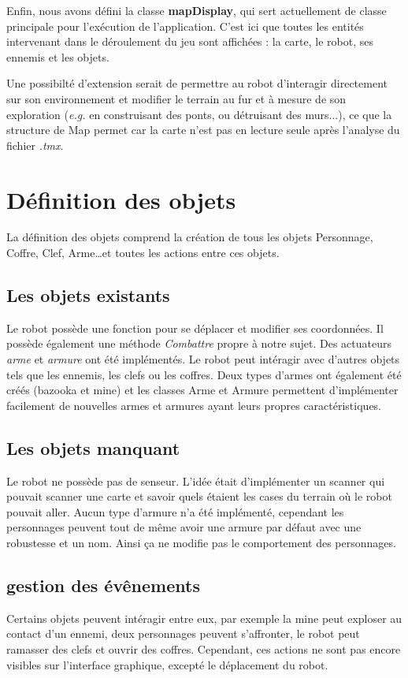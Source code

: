 \documentclass[a4paper 12pts]{article}
\begin{document}
Enfin, nous avons défini la classe \textbf{mapDisplay}, qui sert actuellement de classe principale pour l'exécution de l'application. C'est ici que toutes les entités intervenant dans le déroulement du jeu sont affichées : la carte, le robot, ses ennemis et les objets.

Une possibilté d'extension serait de permettre au robot d'interagir directement sur son environnement et modifier le terrain au fur et à mesure de son exploration (\emph{e.g.} en construisant des ponts, ou détruisant des murs...), ce que la structure de Map permet car la carte n'est pas en lecture seule après l'analyse du fichier \emph{.tmx}. 



\section{Définition des objets}
La définition des objets comprend la création de tous les objets Personnage, Coffre, Clef, Arme\ldots et toutes les actions entre ces objets.

\subsection{Les objets existants}
Le robot possède une fonction pour se déplacer et modifier ses coordonnées. Il possède également une méthode \emph{Combattre} propre à notre sujet. Des actuateurs \emph{arme} et \emph{armure} ont été implémentés. Le robot peut intéragir avec d'autres objets tels que les ennemis, les clefs ou les coffres. Deux types d'armes ont également été créés (bazooka et mine) et les classes Arme et Armure permettent d'implémenter facilement de nouvelles armes et armures ayant leurs propres caractéristiques.

\subsection{Les objets manquant}
Le robot ne possède pas de senseur. L'idée était d'implémenter un scanner qui pouvait scanner une carte et savoir quels étaient les cases du terrain où le robot pouvait aller. Aucun type d'armure n'a été implémenté, cependant les personnages peuvent tout de même avoir une armure par défaut avec une robustesse et un nom. Ainsi ça ne modifie pas le comportement des personnages.

\subsection{gestion des évênements}
Certains objets peuvent intéragir entre eux, par exemple la mine peut exploser au contact d'un ennemi, deux personnages peuvent s'affronter, le robot peut ramasser des clefs et ouvrir des coffres. Cependant, ces actions ne sont pas encore visibles sur l'interface graphique, excepté le déplacement du robot.
\end{document}
